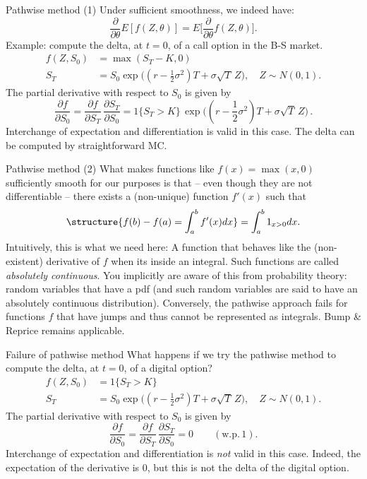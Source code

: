 \documentclass[pdf, handout]{beamer}
\begin{document}
\begin{frame}{Pathwise method (1)}
Under sufficient smoothness, we indeed have:
$$
\frac{\partial}{\partial \theta} E [f(Z,\theta)] = E \Big[ \frac{\partial}{\partial\theta}f(Z,\theta)\Big].
$$
Example: compute the delta, at $t=0$, of a call option in the B-S market.
\begin{align*}
f(Z,S_0) & = \max(S_T-K,0) \\
S_T & = S_0\exp\!\big((r-\tfrac{1}{2}\sigma^2)T + \sigma \sqrt{T} \,Z\big),
\quad Z \sim N(0,1).
\end{align*}
\pause
The partial      derivative with respect to $S_0$ is given by
$$
\frac{\partial f}{\partial S_0} = \frac{\partial f}{ \partial S_T}\, \frac{\partial S_T}{\partial S_0} =
1\{S_T>K\}\,\exp\!\big((r-\frac{1}{2}\sigma^2)T + \sigma \sqrt{T} \,Z\big) \,.
$$
\pause
Interchange of expectation and differentiation is valid in this case. The delta can be
computed by straightforward MC.
\end{frame}

\begin{frame}{Pathwise method (2)}
What makes functions like $f(x)=\max(x,0)$ sufficiently smooth for our purposes is that -- even though they are not differentiable -- there exists a (non-unique) function $f'(x)$
such that
\[
\structure{f(b)-f(a)=\int_a^b f'(x) dx} = \int_a^b 1_{x>0} dx.
\]
Intuitively, this is what we need here: A function that behaves like the (non-existent) derivative of $f$ when its inside an integral. 
Such functions are called \emph{absolutely continuous}. 
You implicitly are aware of this from probability theory: 
random variables that have a pdf (and such random variables are said to have an absolutely continuous distribution).
\vskip2mm
Conversely, the pathwise approach fails for functions $f$ that have jumps and thus cannot be represented as integrals. Bump \& Reprice remains applicable. 
\end{frame}

\begin{frame}{Failure of pathwise method}
What happens if we try the pathwise method to compute the delta, at $t=0$, of a digital option?
\begin{align*}
f(Z,S_0) & = 1\{S_T>K\} \\
S_T & = S_0\exp\!\big((r-\tfrac{1}{2}\sigma^2)T + \sigma \sqrt{T} \,Z\big),
\quad Z \sim N(0,1).
\end{align*}
\vskip2mm\pause
The partial derivative with respect to $S_0$ is given by
$$
\frac{\partial f}{\partial S_0} = \frac{\partial f}{ \partial S_T}\, \frac{\partial S_T}{\partial S_0} =
0 \qquad (\text{w.p.}\,1).
$$
\vskip4mm\pause
Interchange of expectation and differentiation is \emph{not} valid in this case. Indeed,
the expectation of the derivative is $0$, but this is not the delta of the digital option.
\end{frame}
\end{document}
